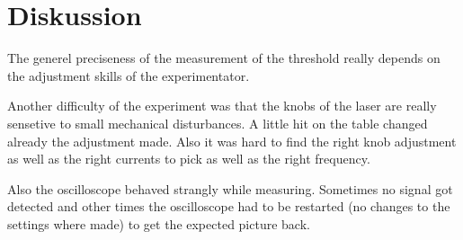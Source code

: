 \section{Diskussion}
\label{sec:Diskussion}
\noindent
The generel preciseness of the measurement of the threshold really depends on the adjustment skills of the 
experimentator. 

\noindent
Another difficulty of the experiment was that the knobs of the laser are really sensetive to small
mechanical disturbances. A little hit on the table changed already the adjustment made. 
Also it was hard to find the right knob adjustment as well as the right currents to pick as well as the right
frequency.

\noindent
Also the oscilloscope behaved strangly while measuring. Sometimes no signal got detected and other times 
the oscilloscope had to be restarted (no changes to the settings where made) to get the expected picture back.

